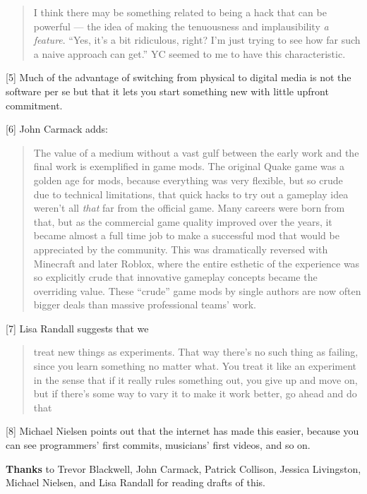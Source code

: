 \begin{quote}
I think there may be something related to being a hack that can be
powerful --- the idea of making the tenuousness and implausibility
\emph{a feature}. ``Yes, it's a bit ridiculous, right? I'm just trying
to see how far such a naive approach can get.'' YC seemed to me to have
this characteristic.
\end{quote}

{[}5{]} Much of the advantage of switching from physical to digital
media is not the software per se but that it lets you start something
new with little upfront commitment.

{[}6{]} John Carmack adds:

\begin{quote}
The value of a medium without a vast gulf between the early work and the
final work is exemplified in game mods. The original Quake game was a
golden age for mods, because everything was very flexible, but so crude
due to technical limitations, that quick hacks to try out a gameplay
idea weren't all \emph{that} far from the official game. Many careers
were born from that, but as the commercial game quality improved over
the years, it became almost a full time job to make a successful mod
that would be appreciated by the community. This was dramatically
reversed with Minecraft and later Roblox, where the entire esthetic of
the experience was so explicitly crude that innovative gameplay concepts
became the overriding value. These ``crude'' game mods by single authors
are now often bigger deals than massive professional teams' work.
\end{quote}

{[}7{]} Lisa Randall suggests that we

\begin{quote}
treat new things as experiments. That way there's no such thing as
failing, since you learn something no matter what. You treat it like an
experiment in the sense that if it really rules something out, you give
up and move on, but if there's some way to vary it to make it work
better, go ahead and do that
\end{quote}

{[}8{]} Michael Nielsen points out that the internet has made this
easier, because you can see programmers' first commits, musicians' first
videos, and so on.

\textbf{Thanks} to Trevor Blackwell, John Carmack, Patrick Collison,
Jessica Livingston, Michael Nielsen, and Lisa Randall for reading drafts
of this.
